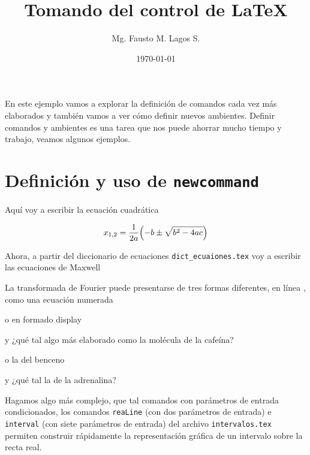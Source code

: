 \documentclass[10pt,a4paper]{article}
\title{Tomando del control de \LaTeX}
\author{Mg. Fausto M. Lagos S.}
\date{\today}
\DeclareRobustCommand{\eqCuadratica}{
	\begin{equation}
		x_{1,2} = \frac{1}{2a}\Bigl(-b \pm\sqrt{b^2 - 4ac}\Bigr)
	\end{equation}
}
\begin{document}
\maketitle
En este ejemplo vamos a explorar la definición de comandos cada vez más elaborados y también vamos a ver cómo definir nuevos ambientes. Definir comandos y ambientes es una tarea que nos puede ahorrar mucho tiempo y trabajo, veamos algunos ejemplos.

\section{Definición y uso de \texttt{newcommand}}

Aquí voy a escribir la ecuación cuadrática
\eqCuadratica{}

Ahora, a partir del diccionario de ecuaciones \texttt{dict\_ecuaiones.tex} voy a escribir las ecuaciones de Maxwell

\textcolor{blue254}{\Maxwell{}}

La transformada de Fourier puede presentarse de tres formas diferentes, en línea \Fourier[inLine], como una ecuación numerada

\Fourier{}

o en formado display

\Fourier[disp]

y ¿qué tal algo más elaborado como la molécula de la cafeína?
\begin{center}
\end{center}

o la del benceno
\begin{center}
\end{center}

y ¿qué tal la de la adrenalina?
\begin{center}
\end{center}

Hagamos algo más complejo, que tal comandos con parámetros de entrada condicionados, los comandos \texttt{reaLine} (con dos parámetros de entrada) e \texttt{interval} (con siete parámetros de entrada) del archivo \texttt{intervalos.tex} permiten construir rápidamente la representación gráfica de un intervalo sobre la recta real.
\end{document}
